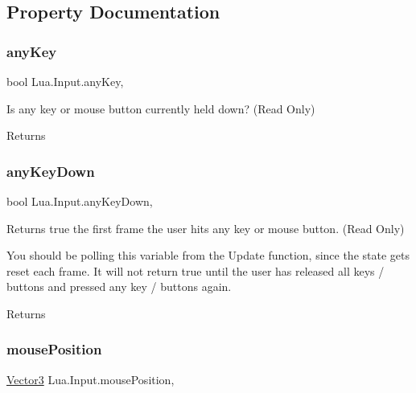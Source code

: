 \subsection{Property Documentation}
\mbox{\label{class_lua_1_1_input_a624c63ec2127ae1a70da0e8ac2a5742d}} 
\subsubsection{\texorpdfstring{anyKey}{anyKey}}
{\footnotesize\ttfamily bool Lua.\+Input.\+any\+Key\hspace{0.3cm}{\ttfamily [static]}, {\ttfamily [get]}}



Is any key or mouse button currently held down? (Read Only) 

\begin{DoxyReturn}{Returns}

\end{DoxyReturn}
\mbox{\label{class_lua_1_1_input_a2587110e95d4dff8d00d112fcade9631}} 
\subsubsection{\texorpdfstring{anyKeyDown}{anyKeyDown}}
{\footnotesize\ttfamily bool Lua.\+Input.\+any\+Key\+Down\hspace{0.3cm}{\ttfamily [static]}, {\ttfamily [get]}}



Returns true the first frame the user hits any key or mouse button. (Read Only) 

You should be polling this variable from the Update function, since the state gets reset each frame. It will not return true until the user has released all keys / buttons and pressed any key / buttons again. \begin{DoxyReturn}{Returns}

\end{DoxyReturn}
\mbox{\label{class_lua_1_1_input_ab5d4bcb7c637ec0760fc8ca8033ecec7}} 
\subsubsection{\texorpdfstring{mousePosition}{mousePosition}}
{\footnotesize\ttfamily \mbox{\hyperlink{class_lua_1_1_vector3}{Vector3}} Lua.\+Input.\+mouse\+Position\hspace{0.3cm}{\ttfamily [static]}, {\ttfamily [get]}}



